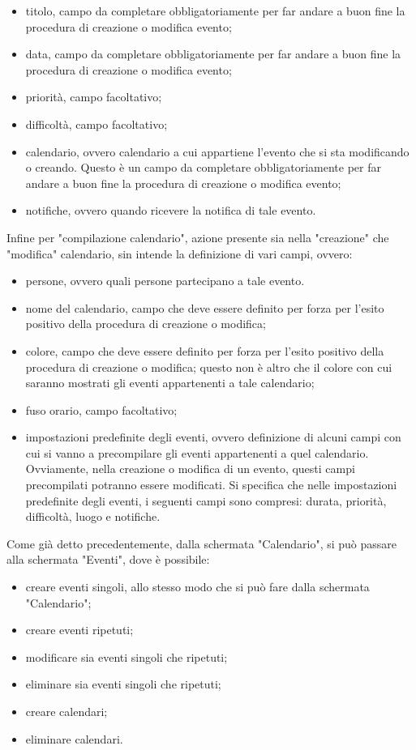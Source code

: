 \begin{itemize}
    \item titolo, campo da completare obbligatoriamente per far andare a buon fine la procedura di creazione o modifica evento;
    \item data, campo da completare obbligatoriamente per far andare a buon fine la procedura di creazione o modifica evento;
    \item priorità, campo facoltativo;
    \item difficoltà, campo facoltativo;
    \item calendario, ovvero calendario a cui appartiene l'evento che si sta modificando o creando. Questo è un campo da completare obbligatoriamente per far andare a buon fine la procedura di creazione o modifica evento;
    \item notifiche, ovvero quando ricevere la notifica di tale evento.
\end{itemize}
Infine per "compilazione calendario", azione presente sia nella "creazione" che "modifica" calendario, sin intende la definizione di vari campi, ovvero:
\begin{itemize}
    \item persone, ovvero quali persone partecipano a tale evento.
    \item nome del calendario, campo che deve essere definito per forza per l'esito positivo della procedura di creazione o modifica;
    \item colore, campo che deve essere definito per forza per l'esito positivo della procedura di creazione o modifica; questo non è altro che il colore con cui saranno mostrati gli eventi appartenenti a tale calendario;
    \item fuso orario, campo facoltativo;
    \item impostazioni predefinite degli eventi, ovvero definizione di alcuni campi con cui si vanno a precompilare gli eventi appartenenti a quel calendario. Ovviamente, nella creazione o modifica di un evento, questi campi precompilati potranno essere modificati. Si specifica che nelle impostazioni predefinite degli eventi, i seguenti campi sono compresi: durata, priorità, difficoltà, luogo e notifiche.
\end{itemize}
Come già detto precedentemente, dalla schermata "Calendario", si può passare alla schermata "Eventi", dove è possibile:
\begin{itemize}
    \item creare eventi singoli, allo stesso modo che si può fare dalla schermata "Calendario";
    \item creare eventi ripetuti;
    \item modificare sia eventi singoli che ripetuti;
    \item eliminare sia eventi singoli che ripetuti;
    \item creare calendari;
    \item eliminare calendari.
\end{itemize}
